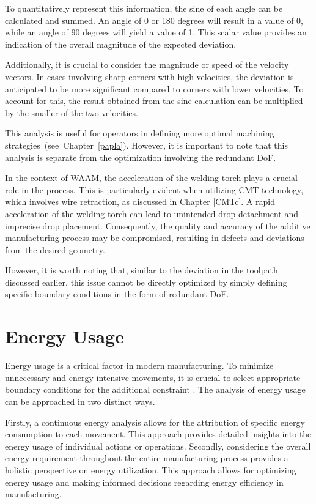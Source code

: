To quantitatively represent this information, the sine of each angle can be calculated and summed. An angle of 0 or 180 degrees will result in a value of 0, while an angle of 90 degrees will yield a value of 1. This scalar value provides an indication of the overall magnitude of the expected deviation.

Additionally, it is crucial to consider the magnitude or speed of the velocity vectors. In cases involving sharp corners with high velocities, the deviation is anticipated to be more significant compared to corners with lower velocities. To account for this, the result obtained from the sine calculation can be multiplied by the smaller of the two velocities.

This analysis is useful for operators in defining more optimal machining strategies~(see~Chapter~\ref{papla}). However, it is important to note that this analysis is separate from the optimization involving the redundant \acrshort{DoF}.

In the context of \acrshort{WAAM}, the acceleration of the welding torch plays a crucial role in the process. This is particularly evident when utilizing \acrshort{CMT} technology, which involves wire retraction, as discussed in Chapter \ref{CMTc}. A rapid acceleration of the welding torch can lead to unintended drop detachment and imprecise drop placement. Consequently, the quality and accuracy of the additive manufacturing process may be compromised, resulting in defects and deviations from the desired geometry.

However, it is worth noting that, similar to the deviation in the toolpath discussed earlier, this issue cannot be directly optimized by simply defining specific boundary conditions in the form of redundant \acrshort{DoF}.

\section{Energy Usage}
Energy usage is a critical factor in modern manufacturing. To minimize unnecessary and energy-intensive movements, it is crucial to select appropriate boundary conditions for the additional constraint . The analysis of energy usage can be approached in two distinct ways.

Firstly, a continuous energy analysis allows for the attribution of specific energy consumption to each movement. This approach provides detailed insights into the energy usage of individual actions or operations. Secondly, considering the overall energy requirement throughout the entire manufacturing process provides a holistic perspective on energy utilization. This approach allows for optimizing energy usage and making informed decisions regarding energy efficiency in manufacturing.

